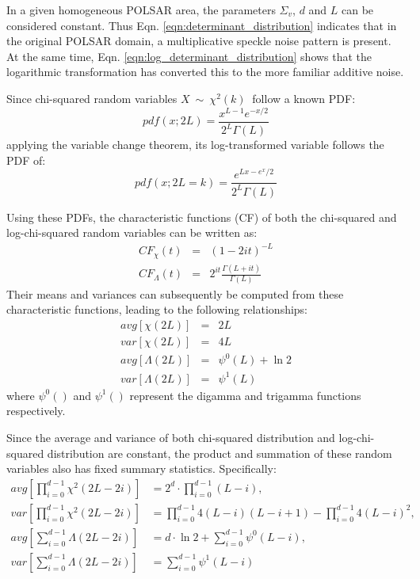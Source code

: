 \documentclass[journal,12pt,draftcls,onecolumn]{IEEEtran}
\begin{document}
In a given homogeneous POLSAR area, the parameters $\Sigma_v$, $d$ and $L$ can be considered constant.
Thus Eqn. \ref{eqn:determinant_distribution} indicates that 
  in the original POLSAR domain, a multiplicative speckle noise pattern is present.
At the same time, Eqn. \ref{eqn:log_determinant_distribution} shows that
  the logarithmic transformation has converted this to the more familiar additive noise.  

Since chi-squared random variables $X\ \sim\ \chi^2(k)\ $ follow a known PDF:
\begin{equation}
pdf(x;2L) =
  \frac{x^{L-1} e^{-x/2}}{2^L \Gamma\left(L\right)}
\label{eqn:chi_squared_dist_pdf:chap4}
\end{equation}
applying the variable change theorem, 
  its log-transformed variable follows the PDF of:
\begin{equation}
  pdf(x;2L=k) = \frac{e^{Lx-e^x/2}}{2^{L}\Gamma(L)}
\end{equation}

Using these PDFs, the characteristic functions (CF) of both the chi-squared and log-chi-squared random variables
  can be written as:
  \begin{eqnarray}
    CF_\chi(t) &=& (1-2it)^{−L} \\ 
    CF_\Lambda(t) &=& 2^{it} \frac{\Gamma(L+it)}{\Gamma(L)} \label{eqn:log_chi_squared_characteristic_function}
  \end{eqnarray}
 Their means and variances can subsequently be computed from these  characteristic functions, leading to the following relationships:  
  \begin{eqnarray}
    avg \left[ \chi(2L) \right]&=&2L \\
var \left[ \chi(2L) \right]&=&4L \\
avg \left[ \Lambda(2L) \right] &=& \psi^0(L) + \ln2 \\
var \left[ \Lambda(2L) \right] &=& \psi^1(L)
  \end{eqnarray}
  where $\psi^0()$ and $\psi^1()$ represent the digamma and trigamma functions respectively.

Since the average and variance of both chi-squared distribution and log-chi-squared distribution are constant,
  the product and summation of these random variables also has fixed summary statistics.
Specifically:
\begin{align*}
  avg \left[ \prod^{d-1}_{i=0} \chi^2(2L-2i) \right] &= 2^d \cdot \prod^{d-1}_{i=0} (L-i), \\
  var \left[ \prod^{d-1}_{i=0} \chi^2(2L-2i) \right] &= \prod^{d-1}_{i=0} 4(L-i)(L-i+1) - \prod^{d-1}_{i=0} 4(L-i)^2, \\
  avg \left[ \sum^{d-1}_{i=0} \Lambda(2L-2i) \right] &= d \cdot \ln{2} + \sum^{d-1}_{i=0} \psi^0(L-i), \\
  var \left[ \sum^{d-1}_{i=0} \Lambda(2L-2i) \right] &= \sum^{d-1}_{i=0} \psi^1(L-i)
\end{align*}
\end{document}
